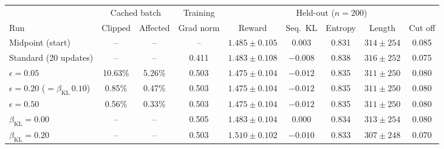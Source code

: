\begin{adjustbox}{max width=\linewidth}
\begin{tabular}{lcccccccc}
\toprule
 & \multicolumn{2}{c}{Cached batch} & Training & \multicolumn{5}{c}{Held-out ($n = 200$)} \\
\cmidrule(lr){2-3} \cmidrule(lr){4-4} \cmidrule(lr){5-9}
Run & Clipped & Affected & Grad norm & Reward & Seq.\ KL & Entropy & Length & Cut off \\
\midrule
Midpoint (start) & -- & -- & -- & $1.485 \pm 0.105$ & 0.003 & 0.831 & $314 \pm 254$ & 0.085 \\
Standard (20 updates) & -- & -- & 0.411 & $1.483 \pm 0.108$ & $-0.008$ & 0.838 & $316 \pm 252$ & 0.075 \\
\midrule
$\epsilon = 0.05$ & 10.63\% & 5.26\% & 0.503 & $1.475 \pm 0.104$ & $-0.012$ & 0.835 & $311 \pm 250$ & 0.080 \\
$\epsilon = 0.20$ ($= \beta_{\mathrm{KL}}\,0.10$) & 0.85\% & 0.47\% & 0.503 & $1.475 \pm 0.104$ & $-0.012$ & 0.835 & $311 \pm 250$ & 0.080 \\
$\epsilon = 0.50$ & 0.56\% & 0.33\% & 0.503 & $1.475 \pm 0.104$ & $-0.012$ & 0.835 & $311 \pm 250$ & 0.080 \\
\midrule
$\beta_{\mathrm{KL}} = 0.00$ & -- & -- & 0.505 & $1.483 \pm 0.104$ & 0.000 & 0.834 & $313 \pm 254$ & 0.080 \\
$\beta_{\mathrm{KL}} = 0.20$ & -- & -- & 0.503 & $1.510 \pm 0.102$ & $-0.010$ & 0.833 & $307 \pm 248$ & 0.070 \\
\bottomrule
\end{tabular}
\end{adjustbox}
